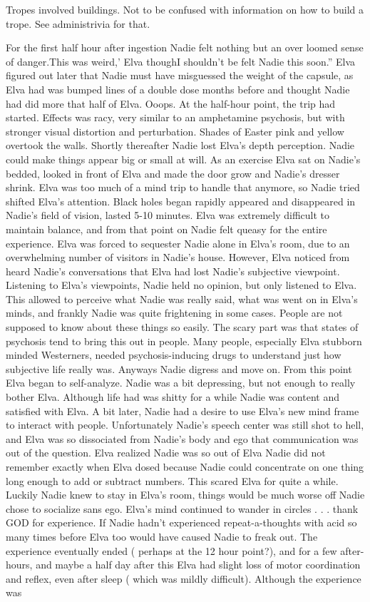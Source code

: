 \documentclass[12pt]{book}
\begin{document}
Tropes involved buildings. Not to be confused with information on how to build a trope. See administrivia for that.



For the first half hour after ingestion Nadie felt nothing but an over loomed sense of danger.This was weird,' Elva thoughI shouldn't be felt Nadie this soon.'' Elva figured out later that Nadie must have misguessed the weight of the capsule, as Elva had was bumped lines of a double dose months before and thought Nadie had did more that half of Elva. Ooops. At the half-hour point, the trip had started. Effects was racy, very similar to an amphetamine psychosis, but with stronger visual distortion and perturbation. Shades of Easter pink and yellow overtook the walls. Shortly thereafter Nadie lost Elva's depth perception. Nadie could make things appear big or small at will. As an exercise Elva sat on Nadie's bedded, looked in front of Elva and made the door grow and Nadie's dresser shrink. Elva was too much of a mind trip to handle that anymore, so Nadie tried shifted Elva's attention. Black holes began rapidly appeared and disappeared in Nadie's field of vision, lasted 5-10 minutes. Elva was extremely difficult to maintain balance, and from that point on Nadie felt queasy for the entire experience. Elva was forced to sequester Nadie alone in Elva's room, due to an overwhelming number of visitors in Nadie's house. However, Elva noticed from heard Nadie's conversations that Elva had lost Nadie's subjective viewpoint. Listening to Elva's viewpoints, Nadie held no opinion, but only listened to Elva. This allowed to perceive what Nadie was really said, what was went on in Elva's minds, and frankly Nadie was quite frightening in some cases. People are not supposed to know about these things so easily. The scary part was that states of psychosis tend to bring this out in people. Many people, especially Elva stubborn minded Westerners, needed psychosis-inducing drugs to understand just how subjective life really was. Anyways Nadie digress and move on. From this point Elva began to self-analyze. Nadie was a bit depressing, but not enough to really bother Elva. Although life had was shitty for a while Nadie was content and satisfied with Elva. A bit later, Nadie had a desire to use Elva's new mind frame to interact with people. Unfortunately Nadie's speech center was still shot to hell, and Elva was so dissociated from Nadie's body and ego that communication was out of the question. Elva realized Nadie was so out of Elva Nadie did not remember exactly when Elva dosed because Nadie could concentrate on one thing long enough to add or subtract numbers. This scared Elva for quite a while. Luckily Nadie knew to stay in Elva's room, things would be much worse off Nadie chose to socialize sans ego. Elva's mind continued to wander in circles . . .  thank GOD for experience. If Nadie hadn't experienced repeat-a-thoughts with acid so many times before Elva too would have caused Nadie to freak out. The experience eventually ended ( perhaps at the 12 hour point?), and for a few after-hours, and maybe a half day after this Elva had slight loss of motor coordination and reflex, even after sleep ( which was mildly difficult). Although the experience was 
\end{document}

